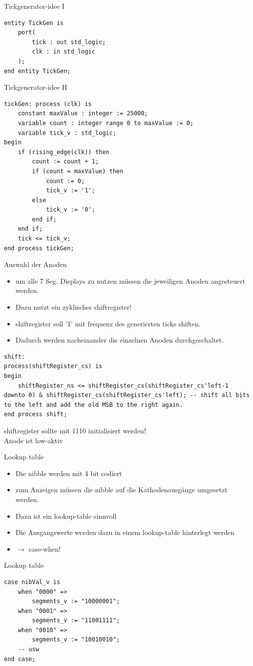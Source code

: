 \documentclass[aspectratio=169,presentation]{beamer}
\begin{document}
\begin{frame} [fragile] {Tickgenerator-idee I}
	\begin{lstlisting}
entity TickGen is
    port(
        tick : out std_logic;
        clk : in std_logic
    );
end entity TickGen;
	\end{lstlisting}
\end{frame}


\begin{frame} [fragile] {Tickgenerator-idee II}
	\vspace{-6mm}
	\begin{lstlisting}
tickGen: process (clk) is
	constant maxValue : integer := 25000;
	variable count : integer range 0 to maxValue := 0;
	variable tick_v : std_logic;
begin
	if (rising_edge(clk)) then
		count := count + 1;
		if (count = maxValue) then
			count := 0;
			tick_v := '1';
		else
			tick_v := '0';
		end if;
	end if;
	tick <= tick_v;
end process tickGen;
	\end{lstlisting}
\end{frame}


\begin{frame} {Auswahl der Anoden}
	\begin{itemize}
		\item um alle 7 Seg. Displays zu nutzen müssen die jeweiligen Anoden angesteuert werden.
		\item Dazu nutzt ein zyklisches shiftregister!
		\item shiftregister soll '1' mit frequenz des generierten ticks shiften.
		\item Dadurch werden nacheinander die einzelnen Anoden durchgeschaltet.
	\end{itemize}
\end{frame}


\begin{frame} [fragile]
	\begin{lstlisting}
shift:
process(shiftRegister_cs) is 
begin
	shiftRegister_ns <= shiftRegister_cs(shiftRegister_cs'left-1 downto 0) & shiftRegister_cs(shiftRegister_cs'left); -- shift all bits to the left and add the old MSB to the right again.
end process shift;
	\end{lstlisting}
	shiftregister sollte mit \grqq{}1110\grqq{} initialisiert werden!\\
	Anode ist low-aktiv
\end{frame}


\begin{frame} {Lookup table}
	\begin{itemize}
		\item Die nibble werden mit 4 bit codiert
		\item zum Anzeigen müssen die nibble auf die Kathodenausgänge umgesetzt werden.
		\item Dazu ist ein lookup-table sinnvoll
		\item Die Ausgangswerte werden dazu in einem lookup-table hinterlegt werden
		\item $\rightarrow$ case-when!
	\end{itemize}
\end{frame}

\begin{frame} [fragile] {Lookup table}
	\begin{lstlisting}
case nibVal_v is
	when "0000" => 
		segments_v := "10000001";
	when "0001" => 
		segments_v := "11001111";
	when "0010" => 
		segments_v := "10010010";    
	-- usw
end case;
	\end{lstlisting}
\end{frame}
\end{document}
